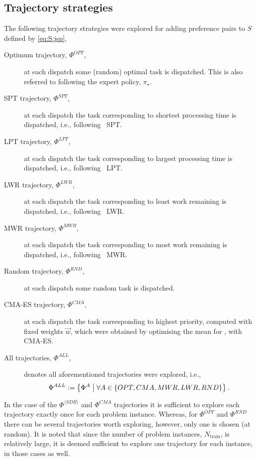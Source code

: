 \subsection{Trajectory strategies}
The following trajectory strategies were explored for adding preference pairs to $S$ defined by \cref{eq:S:jsp},
\begin{description}
	\item[Optimum trajectory, $\Phi^{OPT}$,] at each dispatch some (random) 
    optimal task is dispatched. This is also referred to following the expert 
    policy, $\pi_\star$.	\item[SPT trajectory, $\Phi^{SPT}$,] at each 
    dispatch 
    the task 
	corresponding to shortest processing time is dispatched, i.e., following 
	\sdr~SPT.
	\item[LPT trajectory, $\Phi^{LPT}$,] at each dispatch the task 
	corresponding to largest processing time is dispatched, i.e., following 
	\sdr~LPT.
	\item[LWR trajectory, $\Phi^{LWR}$,] at each dispatch the task 
	corresponding to least work remaining is dispatched, i.e., following 
	\sdr~LWR.
	\item[MWR trajectory, $\Phi^{MWR}$,] at each dispatch the task 
	corresponding to most work remaining is dispatched, i.e., following 
	\sdr~MWR.
	\item[Random trajectory, $\Phi^{RND}$,] at each dispatch some random task 
	is dispatched.
	\item[CMA-ES trajectory, $\Phi^{CMA}$,] at each dispatch the task 
	corresponding to highest priority, computed with fixed weights $\vec{w}$, 
	which were obtained by optimising the mean for \fullnamerho, with CMA-ES. 
	\item[All trajectories, $\Phi^{ALL}$,] denotes all aforementioned 
	trajectories were explored, i.e., 
	\begin{equation}
		\Phi^{ALL}:=\left\{\Phi^{A}\;\middle|\;\forall A \in \{OPT,CMA,MWR,LWR,RND\}\right\}.
	\end{equation}
\end{description}
In the case of the $\Phi^{\langle SDR \rangle}$ and $\Phi^{CMA}$ trajectories 
it is sufficient to explore each trajectory exactly once for each problem 
instance. Whereas, for $\Phi^{OPT}$ and $\Phi^{RND}$ there can be several 
trajectories worth exploring, however, only one is chosen (at random). It is 
noted that since the number of problem instances, $N_{\text{train}}$, is 
relatively large, it is deemed sufficient to explore one trajectory for each 
instance, in those cases as well.

